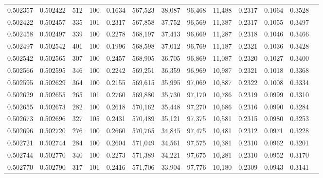 \begin{tabular}{rrrrrrrrrrrrr}
0.502357 & 0.502422 &   512 & 100 &                                     0.1634 & 567,523 &  38,087 &  96,468 &  11,488 & 0.2317 & 0.1064 & 0.3528 \\
0.502422 & 0.502457 &   335 & 101 &                                     0.2317 & 567,858 &  37,752 &  96,569 &  11,387 & 0.2317 & 0.1055 & 0.3497 \\
0.502458 & 0.502497 &   339 & 100 &                                     0.2278 & 568,197 &  37,413 &  96,669 &  11,287 & 0.2318 & 0.1046 & 0.3466 \\
0.502497 & 0.502542 &   401 & 100 &                                     0.1996 & 568,598 &  37,012 &  96,769 &  11,187 & 0.2321 & 0.1036 & 0.3428 \\
0.502542 & 0.502565 &   307 & 100 &                                     0.2457 & 568,905 &  36,705 &  96,869 &  11,087 & 0.2320 & 0.1027 & 0.3400 \\
0.502566 & 0.502595 &   346 & 100 &                                     0.2242 & 569,251 &  36,359 &  96,969 &  10,987 & 0.2321 & 0.1018 & 0.3368 \\
0.502595 & 0.502629 &   364 & 100 &                                     0.2155 & 569,615 &  35,995 &  97,069 &  10,887 & 0.2322 & 0.1008 & 0.3334 \\
0.502629 & 0.502655 &   265 & 101 &                                     0.2760 & 569,880 &  35,730 &  97,170 &  10,786 & 0.2319 & 0.0999 & 0.3310 \\
0.502655 & 0.502673 &   282 & 100 &                                     0.2618 & 570,162 &  35,448 &  97,270 &  10,686 & 0.2316 & 0.0990 & 0.3284 \\
0.502673 & 0.502696 &   327 & 105 &                                     0.2431 & 570,489 &  35,121 &  97,375 &  10,581 & 0.2315 & 0.0980 & 0.3253 \\
0.502696 & 0.502720 &   276 & 100 &                                     0.2660 & 570,765 &  34,845 &  97,475 &  10,481 & 0.2312 & 0.0971 & 0.3228 \\
0.502721 & 0.502744 &   284 & 100 &                                     0.2604 & 571,049 &  34,561 &  97,575 &  10,381 & 0.2310 & 0.0962 & 0.3201 \\
0.502744 & 0.502770 &   340 & 100 &                                     0.2273 & 571,389 &  34,221 &  97,675 &  10,281 & 0.2310 & 0.0952 & 0.3170 \\
0.502770 & 0.502790 &   317 & 101 &                                     0.2416 & 571,706 &  33,904 &  97,776 &  10,180 & 0.2309 & 0.0943 & 0.3141 \\

\end{tabular}
